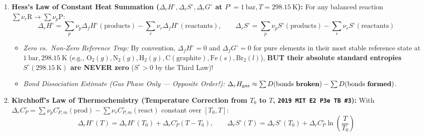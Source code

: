 \begin{formulacard}
\begin{enumerate}
  \item \textbf{Hess's Law of Constant Heat Summation ($\Delta_r H^\circ, \Delta_r S^\circ, \Delta_r G^\circ$ at $P^\circ = \SI{1}{\bar}, T = \SI{298.15}{\kelvin}$):}
  For any balanced reaction $\sum \nu_r \mathrm{R} \to \sum \nu_p \mathrm{P}$:
  \begin{equation}\label{eq:08:hess}
    \boxed{\Delta_r H^\circ = \sum_p \nu_p \Delta_f H^\circ(\mathrm{products}) - \sum_r \nu_r \Delta_f H^\circ(\mathrm{reactants})}, \qquad \boxed{\Delta_r S^\circ = \sum_p \nu_p S^\circ(\mathrm{products}) - \sum_r \nu_r S^\circ(\mathrm{reactants})}
  \end{equation}
  \begin{itemize}
    \item \emph{Zero vs.\ Non-Zero Reference Trap:} By convention, $\Delta_f H^\circ = 0$ and $\Delta_f G^\circ = 0$ for pure elements in their most stable reference state at $\SI{1}{\bar}, \SI{298.15}{\kelvin}$ (e.g., $\mathrm{O_2}(g), \mathrm{N_2}(g), \mathrm{H_2}(g), \mathrm{C(graphite)}, \mathrm{Fe}(s), \mathrm{Br_2}(l)$), \textbf{BUT their absolute standard entropies $S^\circ(\SI{298.15}{\kelvin})$ are NEVER zero} ($S^\circ > 0$ by the Third Law)!
    \item \emph{Bond Dissociation Estimate (Gas Phase Only — Opposite Order!):} $\Delta_r H_{\mathrm{gas}} \approx \sum D(\text{bonds \textbf{broken}}) - \sum D(\text{bonds \textbf{formed}})$.
  \end{itemize}
  \item \textbf{Kirchhoff's Law of Thermochemistry (Temperature Correction from $T_0$ to $T$, \texttt{2019 MIT E2 P3e TB \#3}):}
  With $\Delta_r C_P^\circ = \sum \nu_p C_{P,m}^\circ(\mathrm{prod}) - \sum \nu_r C_{P,m}^\circ(\mathrm{react})$ constant over $[T_0, T]$:
  \begin{equation}\label{eq:08:kirchhoff}
    \boxed{\Delta_r H^\circ(T) = \Delta_r H^\circ(T_0) + \Delta_r C_P^\circ (T - T_0)}, \qquad \boxed{\Delta_r S^\circ(T) = \Delta_r S^\circ(T_0) + \Delta_r C_P^\circ \ln\left(\frac{T}{T_0}\right)}
  \end{equation}

\end{enumerate}
\end{formulacard}
